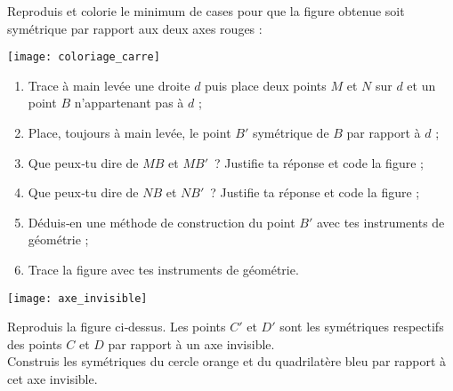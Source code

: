 
\begin{exercice}[Coloriage]
Reproduis et colorie le minimum de cases pour que la figure obtenue soit symétrique par rapport aux deux axes rouges :
\begin{center} \texttt{[image: coloriage\_carre]} \end{center}
\end{exercice}


\begin{exercice}
\begin{enumerate}
 \item Trace à main levée une droite $d$ puis place deux points $M$ et $N$ sur $d$ et un point $B$ n'appartenant pas à $d$ ;
 \item Place, toujours à main levée, le point $B'$ symétrique de $B$ par rapport à $d$ ;
 \item Que peux‑tu dire de $MB$ et $MB'$ ? Justifie ta réponse et code la figure ;
 \item Que peux‑tu dire de $NB$ et $NB'$ ? Justifie ta réponse et code la figure ;
 \item Déduis‑en une méthode de construction du point $B'$ avec tes instruments de géométrie ;
 \item Trace la figure avec tes instruments de géométrie.
 \end{enumerate}
\end{exercice}


\begin{exercice}
\begin{center} \texttt{[image: axe\_invisible]} \end{center}
Reproduis la figure ci‑dessus. Les points $C'$ et $D'$ sont les symétriques respectifs des points $C$ et $D$ par rapport à un axe invisible. \\[0.5em]
Construis les symétriques du cercle orange et du quadrilatère bleu par rapport à cet axe invisible.
\end{exercice}


